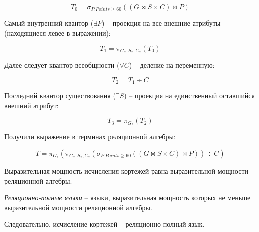 \[
	T_0 = \sigma_{P.Points \geq 60}((G \bowtie S \times C) \bowtie P)
\]

Самый внутренний квантор ($\exists P$) -- проекция на все внешние атрибуты (находящиеся
левее в выражении):

\[
	T_1 = \pi_{G_*, S_*, C_*}(T_0)
\]

Далее следует квантор всеобщности ($\forall C$) -- деление на переменную:

\[
	T_2 = T_1 \div C
\]

Последний квантор существования ($\exists S$) -- проекция на единственный оставшийся
внешний атрибут:

\[
	T_3 = \pi_{G_*}(T_2)
\]

Получили выражение в терминах реляционной алгебры:

\[
	T = \pi_{G_*}(\pi_{G_*, S_*, C_*} (\sigma_{P.Points \geq 60}((G \bowtie S \times C) \bowtie P))
	\div C)
\]

\begin{proposition}
	Выразительная мощность исчисления кортежей равна выразительной мощности реляционной алгебры.
\end{proposition}

\begin{definition}
	\textit{Реляционно-полные языки} -- языки, выразительная мощность которых не меньше
	выразительной мощности реляционной алгебры.
\end{definition}

Следовательно, исчисление кортежей -- реляционно-полный язык.
